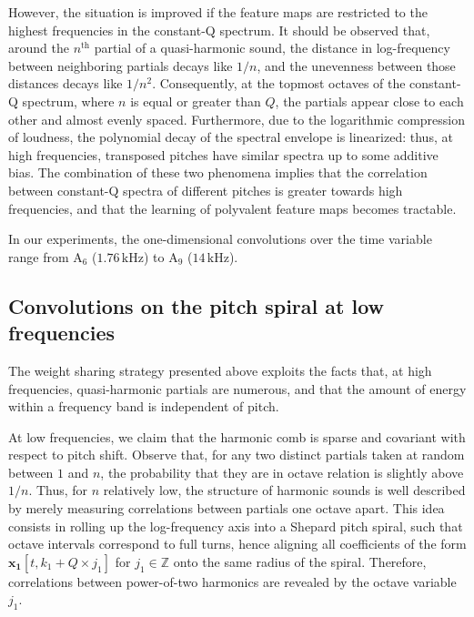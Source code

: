 \documentclass{article}
\begin{document}
However, the situation is improved if the feature maps
are restricted to the highest frequencies in the constant-Q spectrum.
It should be observed that, around the $n^{\textrm{th}}$ partial of a quasi-harmonic sound,
the distance in log-frequency between neighboring partials decays like $1/n$,
and the unevenness between those distances decays like $1/n^2$.
Consequently, at the topmost octaves of the constant-Q spectrum,
where $n$ is equal or greater than $Q$, the partials appear close to each other and almost
evenly spaced.
Furthermore, due to the logarithmic compression of loudness, the polynomial decay
of the spectral envelope is linearized: thus, at high frequencies, transposed pitches
have similar spectra up to some additive bias.
The combination of these two phenomena implies that the correlation between
constant-Q spectra of different pitches is greater towards high frequencies, and that
the learning of polyvalent feature maps becomes tractable.


In our experiments, the one-dimensional convolutions over the time variable
range from
$\mathrm{A_6}$ ($1.76\,\mathrm{kHz}$) to
$\mathrm{A_9}$ ($14\,\mathrm{kHz}$).

\subsection{Convolutions on the pitch spiral at low frequencies}
The weight sharing strategy presented above exploits the facts that,
at high frequencies, quasi-harmonic partials are numerous, and that the
amount of energy within a frequency band is independent of pitch.

At low frequencies, we claim
that the harmonic comb is sparse and covariant with respect to pitch shift.
Observe that, for any two distinct partials taken at random between $1$ and $n$,
the probability that they are in octave relation is slightly above $1/n$.
Thus, for $n$ relatively low, the structure of harmonic sounds is well
described by merely measuring correlations between partials one octave apart.
This idea consists in rolling up the log-frequency axis into a Shepard pitch spiral,
such that octave intervals correspond to full turns, hence aligning all coefficients
of the form $\boldsymbol{x_1}[t, k_1 + Q \times j_1]$ for $j_1 \in \mathbb{Z}$
onto the same radius of the spiral.
Therefore, correlations between power-of-two harmonics are revealed by
the octave variable $j_1$.
\end{document}

